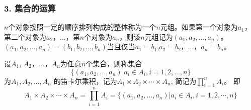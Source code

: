 \documentclass{beamer}
\begin{document}
\begin{CJK*}{UTF8}{gbsn}
\begin{frame}
  \frametitle{3. 集合的运算}
  \begin{Def}
    $n$个对象按照一定的顺序排列构成的整体称为一个\alert{$n$元组}。如果第一个对象为$a_1$，第二个对象为$a_2$，$\ldots$，第$n$个对象为$a_n$，则该$n$元组记为$(a_1,a_2, \ldots, a_n)$。
$(a_1,a_2, \ldots, a_n)=(b_1,b_2, \ldots, b_n)$当且仅当$a_1=b_1$,$a_2=b_2$，$\ldots$，$a_n=b_n$。
  \end{Def}\pause
  \begin{Def}
    设$A_1$, $A_2$，$\ldots$，$A_n$为任意$n$个集合，则称集合 \[\{(a_1,a_2, \ldots, a_n)|a_i\in A_i, i = 1,2,\ldots, n\}\] 为$A_1, A_2, \ldots, A_n$ 的\alert{笛卡尔乘积}，记为$A_1 \times A_2 \times \cdots \times A_n$, 简记为$\prod_{i=1}^nA_i$。
即\small{\vspace{-0.4cm}
\begin{equation*}
  A_1 \times A_2 \times \cdots \times A_n = \prod_{i=1}^nA_i = \{(a_1,a_2, \ldots, a_n)|a_i \in A_i, i = 1, 2, \cdots, n\}
\end{equation*}}
  \end{Def}


\end{frame}
\end{CJK*}
\end{document}
